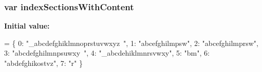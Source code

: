 \subsubsection[{index\-Sections\-With\-Content}]{\setlength{\rightskip}{0pt plus 5cm}var index\-Sections\-With\-Content}\label{search_8js_a6250af3c9b54dee6efc5f55f40c78126}
{\bfseries Initial value\-:}
\begin{DoxyCode}
=
\{
  0: \textcolor{stringliteral}{"\_abcdefghiklmnoprstuvwxyz~"},
  1: \textcolor{stringliteral}{"abcefghilmpsw"},
  2: \textcolor{stringliteral}{"abcefghilmprsw"},
  3: \textcolor{stringliteral}{"abcdefghilmnpsuwxy~"},
  4: \textcolor{stringliteral}{"\_abcdehiklmnrsvwxy"},
  5: \textcolor{stringliteral}{"bm"},
  6: \textcolor{stringliteral}{"abdefghikostvz"},
  7: \textcolor{stringliteral}{"r"}
\}
\end{DoxyCode}
